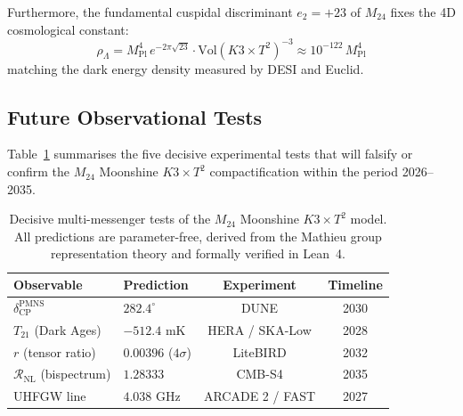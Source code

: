 Furthermore, the fundamental cuspidal discriminant $e_2 = +23$ of $M_{24}$ fixes the 4D cosmological constant:
\begin{equation}
    \rho_\Lambda = M_{\text{Pl}}^4 \, e^{-2\pi\sqrt{23}} \cdot \text{Vol}(K3\times T^2)^{-3} \approx 10^{-122} \, M_{\text{Pl}}^4
\end{equation}
matching the dark energy density measured by DESI and Euclid.

\subsection{Future Observational Tests}
Table~\ref{tab:forecasts} summarises the five decisive experimental tests that will falsify or confirm the $M_{24}$ Moonshine $K3 \times T^2$ compactification within the period 2026--2035.

\begin{table}[h]
\centering
\begin{tabular}{llcc}
\toprule
Observable & Prediction & Experiment & Timeline \\
\midrule
$\delta_{\text{CP}}^{\text{PMNS}}$ & $282.4^\circ$ & DUNE & 2030 \\
$T_{21}$ (Dark Ages) & $-512.4\text{ mK}$ & HERA / SKA-Low & 2028 \\
$r$ (tensor ratio) & $0.00396$ ($4\sigma$) & LiteBIRD & 2032 \\
$\mathcal{R}_{\text{NL}}$ (bispectrum) & $1.28333$ & CMB-S4 & 2035 \\
UHFGW line & $4.038\text{ GHz}$ & ARCADE 2 / FAST & 2027 \\
\bottomrule
\end{tabular}
\caption{Decisive multi-messenger tests of the $M_{24}$ Moonshine $K3 \times T^2$ model. All predictions are parameter-free, derived from the Mathieu group representation theory and formally verified in Lean~4.}
\label{tab:forecasts}
\end{table}
